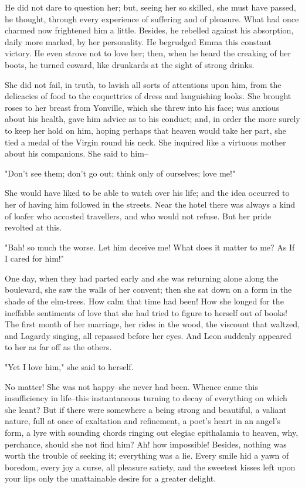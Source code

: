 \documentclass{tufte-book}
\begin{document}
He did not dare to question her; but, seeing her so skilled, she must
have passed, he thought, through every experience of suffering and of
pleasure. What had once charmed now frightened him a little. Besides, he
rebelled against his absorption, daily more marked, by her personality.
He begrudged Emma this constant victory. He even strove not to love her;
then, when he heard the creaking of her boots, he turned coward, like
drunkards at the sight of strong drinks.

She did not fail, in truth, to lavish all sorts of attentions upon him,
from the delicacies of food to the coquettries of dress and languishing
looks. She brought roses to her breast from Yonville, which she threw
into his face; was anxious about his health, gave him advice as to his
conduct; and, in order the more surely to keep her hold on him, hoping
perhaps that heaven would take her part, she tied a medal of the
Virgin round his neck. She inquired like a virtuous mother about his
companions. She said to him--

"Don't see them; don't go out; think only of ourselves; love me!"

She would have liked to be able to watch over his life; and the idea
occurred to her of having him followed in the streets. Near the hotel
there was always a kind of loafer who accosted travellers, and who would
not refuse. But her pride revolted at this.

"Bah! so much the worse. Let him deceive me! What does it matter to me?
As If I cared for him!"

One day, when they had parted early and she was returning alone along
the boulevard, she saw the walls of her convent; then she sat down on a
form in the shade of the elm-trees. How calm that time had been! How she
longed for the ineffable sentiments of love that she had tried to figure
to herself out of books! The first month of her marriage, her rides in
the wood, the viscount that waltzed, and Lagardy singing, all repassed
before her eyes. And Leon suddenly appeared to her as far off as the
others.

"Yet I love him," she said to herself.

No matter! She was not happy--she never had been. Whence came this
insufficiency in life--this instantaneous turning to decay of everything
on which she leant? But if there were somewhere a being strong and
beautiful, a valiant nature, full at once of exaltation and refinement,
a poet's heart in an angel's form, a lyre with sounding chords ringing
out elegiac epithalamia to heaven, why, perchance, should she not find
him? Ah! how impossible! Besides, nothing was worth the trouble of
seeking it; everything was a lie. Every smile hid a yawn of boredom,
every joy a curse, all pleasure satiety, and the sweetest kisses left
upon your lips only the unattainable desire for a greater delight.
\end{document}
